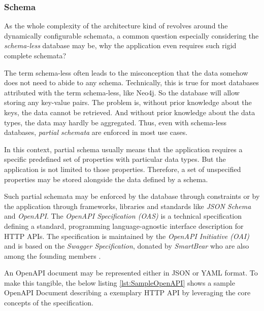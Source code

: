 \subsubsection{Schema}
As the whole complexity of the architecture kind of revolves around the dynamically configurable schemata, a common question especially considering the \emph{schema-less} database may be, why the application even requires such rigid complete schemata?\par
The term schema-less often leads to the misconception that the data somehow does not need to abide to any schema. Technically, this is true for most databases attributed with the term schema-less, like Neo4j. So the database will allow storing any key-value pairs. The problem is, without prior knowledge about the keys, the data cannot be retrieved. And without prior knowledge about the data types, the data may hardly be aggregated. Thus, even with schema-less databases, \emph{partial schemata} are enforced in most use cases.\par
In this context, partial schema usually means that the application requires a specific predefined set of properties with particular data types. But the application is not limited to those properties. Therefore, a set of unspecified properties may be stored alongside the data defined by a schema.\par 
Such partial schemata may be enforced by the database through constraints or by the application through frameworks, libraries and standards like \emph{JSON Schema} \cite{JsonSchema} and \emph{OpenAPI}. The \emph{OpenAPI Specification (OAS)} is a technical specification defining a standard, programming language-agnostic interface description for HTTP APIs. The specification is maintained by the \emph{OpenAPI Initiative (OAI)} and is based on the \emph{Swagger Specification}, donated by \emph{SmartBear} who are also among the founding members \cite{OpenAPISpec}.\par
An OpenAPI document may be represented either in JSON or YAML format. To make this tangible, the below listing \ref{lst:SampleOpenAPI} shows a sample OpenAPI Document describing a exemplary HTTP API by leveraging the core concepts of the specification.

